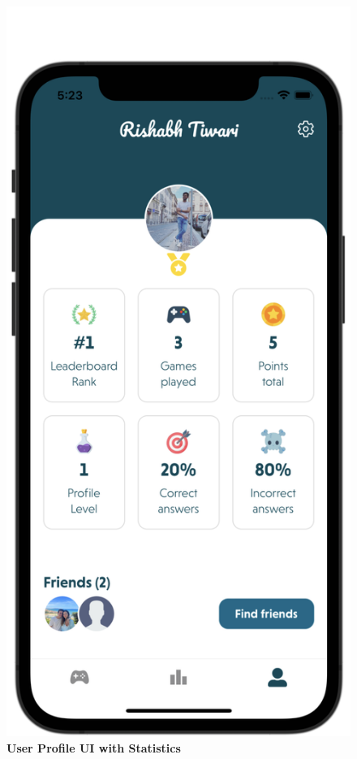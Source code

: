 \begin{figure}[H]
    \centering
    \begin{minipage}[b]{0.43\linewidth}
        \centering
        \includegraphics[width=\linewidth]{Screens_UI/My Profile.png}
        \caption{\textbf{User Profile UI with Statistics}}
    \end{minipage}
\end{figure}


